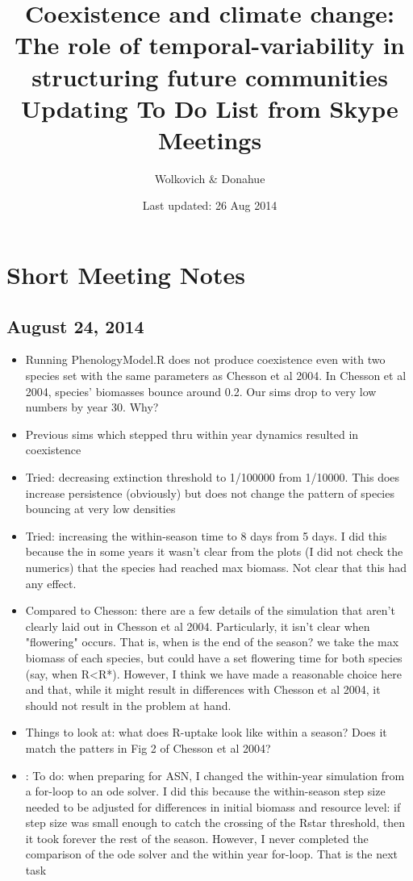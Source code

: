 \documentclass[11pt,a4paper,oneside]{article}
\begin{document}
\renewcommand{\labelitemi}{$-$}
\title{Coexistence and climate change: \\The role of
    temporal-variability in structuring future communities \\Updating To Do List from Skype Meetings}
    \author{Wolkovich \& Donahue}
\date{Last updated: 26 Aug 2014}
\maketitle

\newpage
\tableofcontents

\section{Short Meeting Notes}
\subsection{August 24, 2014}
\begin{itemize}
\item Running PhenologyModel.R does not produce coexistence even with two species set with the same parameters as Chesson et al 2004.  In Chesson et al 2004, species' biomasses bounce around 0.2.  Our sims drop to very low numbers by year 30.  Why?
\item Previous sims which stepped thru within year dynamics resulted in coexistence
\item Tried: decreasing extinction threshold to 1/100000 from 1/10000.  This does increase persistence (obviously) but does not change the pattern of species bouncing at very low densities
\item Tried: increasing the within-season time to 8 days from 5 days.  I did this because the in some years it wasn't clear from the plots (I did not check the numerics) that the species had reached max biomass.  Not clear that this had any effect.
\item Compared to Chesson: there are a few details of the simulation that aren't clearly laid out in Chesson et al 2004.  Particularly, it isn't clear when "flowering" occurs.  That is,  when is the end of the season?  we take the max biomass of each species, but could have a set flowering time for both species (say, when R<R*).  However, I think we have made a reasonable choice here and that, while it might result in differences with Chesson et al 2004, it should not result in the problem at hand.
\item Things to look at: what does R-uptake look like within a season?  Does it match the patters in Fig 2 of Chesson et al 2004?
\item: To do: when preparing for ASN, I changed the within-year simulation from a for-loop to an ode solver.  I did this because the within-season step size needed to be adjusted for differences in initial biomass and resource level: if step size was small enough to catch the crossing of the Rstar threshold, then it took forever the rest of the season.  However, I never completed the comparison of the ode solver and the within year for-loop.  That is the next task
\end{itemize}
\end{document}
